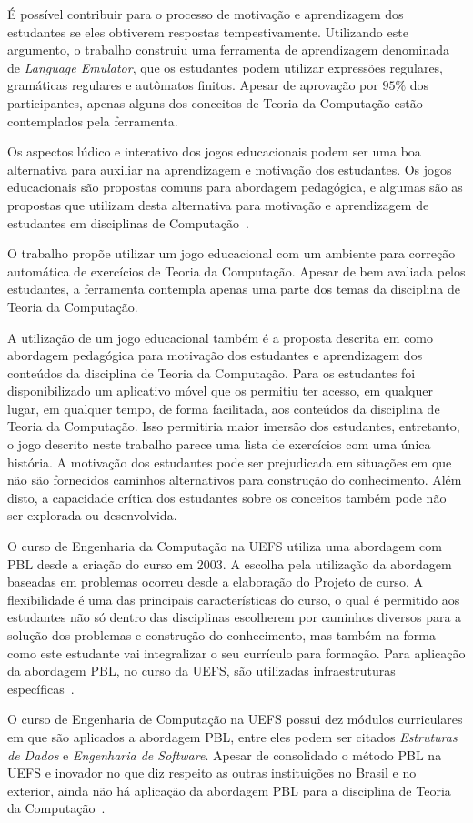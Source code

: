 É possível contribuir para o processo de
motivação e aprendizagem dos estudantes se
eles obtiverem respostas
tempestivamente.
Utilizando este argumento, o
trabalho  construiu
uma ferramenta de aprendizagem denominada
de \textit{Language Emulator}, que os estudantes
podem utilizar expressões regulares, gramáticas
regulares e autômatos finitos.
Apesar de aprovação por $95\%$ dos
participantes, apenas alguns dos conceitos de Teoria
da Computação estão contemplados pela ferramenta.

Os aspectos lúdico e interativo dos jogos educacionais
podem ser uma boa alternativa para auxiliar na aprendizagem
e motivação dos estudantes.
Os jogos educacionais são propostas comuns para abordagem
pedagógica, e algumas são as propostas que utilizam
desta alternativa para motivação e aprendizagem
de estudantes em disciplinas de Computação~\cite{silva2010automata}.

O trabalho  propõe utilizar
um jogo educacional com um ambiente para correção
automática de exercícios de Teoria da Computação.
Apesar de bem avaliada pelos estudantes, a ferramenta
contempla apenas uma parte dos temas da disciplina
de Teoria da Computação.

A utilização de um jogo educacional também é a
proposta descrita em 
como abordagem pedagógica para motivação dos estudantes
e aprendizagem dos conteúdos da disciplina de Teoria da
Computação.
Para os estudantes foi disponibilizado um aplicativo
móvel que os permitiu ter acesso, em qualquer lugar,
em qualquer tempo, de forma facilitada, aos conteúdos
da disciplina de Teoria da Computação.
Isso permitiria
maior imersão dos estudantes, entretanto, o jogo
descrito neste trabalho parece uma lista de
exercícios com uma única história.
A motivação dos estudantes pode ser prejudicada
em situações em que não são fornecidos caminhos
alternativos para construção do conhecimento.
Além disto, a capacidade crítica dos estudantes
sobre os conceitos também pode não ser explorada
ou desenvolvida.

O curso de Engenharia da Computação na
\ac{UEFS} utiliza uma abordagem com PBL desde a criação
do curso em 2003.
A escolha pela utilização da abordagem baseadas em
problemas ocorreu desde a elaboração do Projeto de curso.
A flexibilidade é uma das principais características do
curso, o qual é permitido aos estudantes não só dentro
das disciplinas escolherem por caminhos diversos
para a solução dos problemas e construção do conhecimento,
mas também na forma como este estudante vai integralizar
o seu currículo para formação.
Para aplicação da abordagem \ac{PBL}, no curso da \ac{UEFS},
são utilizadas infraestruturas
específicas~\cite{dos2007aplicaccao, bittencourt2003curriculo}.

O curso de Engenharia de Computação na \ac{UEFS}
possui dez módulos curriculares em que são
aplicados a abordagem PBL, entre eles podem ser citados
\textit{Estruturas de Dados} e
\textit{Engenharia de Software}.
Apesar de consolidado o método PBL na \ac{UEFS}
e inovador no que diz respeito as outras
instituições no Brasil e no exterior,
ainda não há aplicação da abordagem PBL para
a disciplina de Teoria da Computação~\cite{dospensamento}.

